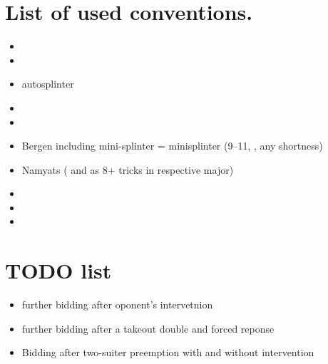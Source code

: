 \documentclass[12pt,a4paper,twoside]{article}
\begin{document}
  \section{List of used conventions.}
  \begin{itemize}
    \item  \pagebreak[2]
    \item  \pagebreak[2]
    \item autosplinter \pagebreak[2]
    \item  \pagebreak[2]
    \item  \pagebreak[2]
    \item Bergen including mini-splinter \newline \pagebreak[2]
       = minisplinter (9--11, , any shortness) \pagebreak[2]
    \item Namyats ( and  as 8+ tricks in respective major) \pagebreak[2]
    \item  \pagebreak[2]
    \item  \pagebreak[2]
    \item  \pagebreak[2]
  \end{itemize}

  \section{TODO list}
  \begin{itemize}
    \item further bidding after oponent's intervetnion
    \item further bidding after a takeout double and forced reponse
    \item Bidding after two-suiter preemption with and without intervention
  \end{itemize}
\end{document}
